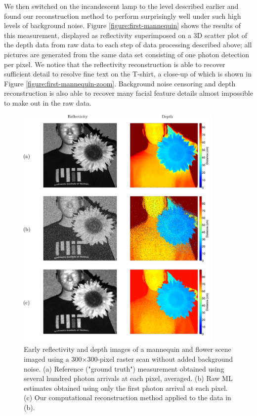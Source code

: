 We then switched on the incandescent lamp to the level described earlier and found our reconstruction method to perform surprisingly well under such high levels of background noise. Figure \ref{figure:first-mannequin} shows the results of this measurement, displayed as reflectivity superimposed on a 3D scatter plot of the depth data from raw data to each step of data processing described above; all pictures are generated from the same data set consisting of one photon detection per pixel. We notice that the reflectivity reconstruction is able to recover sufficient detail to resolve fine text on the T-shirt, a close-up of which is shown in Figure \ref{figure:first-mannequin-zoom}. Background noise censoring and depth reconstruction is also able to recover many facial feature details almost impossible to make out in the raw data.

\begin{figure}[h!]
\centerline{\includegraphics[width=0.9\textwidth]{figure-first-manflower.pdf}}
\caption{Early reflectivity and depth images of a mannequin and flower scene imaged using a 300$\times$300-pixel raster scan without added background noise. (a) Reference ("ground truth") measurement obtained using several hundred photon arrivals at each pixel, averaged. (b) Raw ML estimates obtained using only the first photon arrival at each pixel. (c) Our computational reconstruction method applied to the data in (b).}
\label{figure:first-manflower}
\end{figure}

